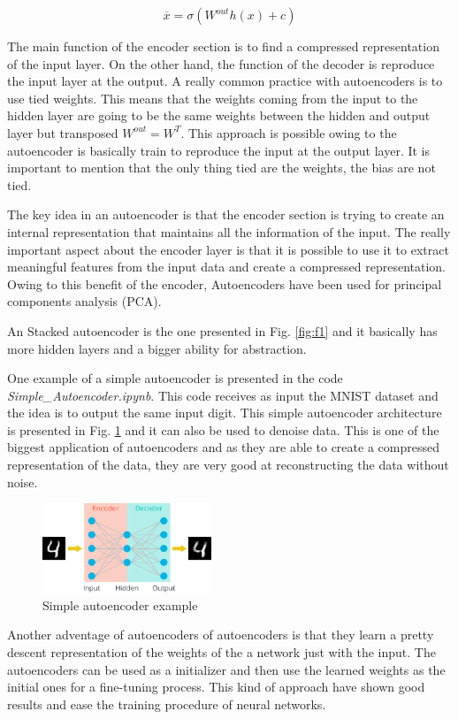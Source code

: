 \documentclass{article}
\begin{document}
\begin{equation}
\overline{x} = \sigma(W^{out}h(x) + c)
\label{eq:2}
\end{equation}

The main function of the encoder section is to find a compressed representation of the input layer. On the other hand, the function of the decoder is reproduce the input layer at the output. A really common practice with autoencoders is to use tied weights. This means that the weights coming from the input to the hidden layer are going to be the same weights between the hidden and output layer but transposed \(W^{out} = W^T\). This approach is possible owing to the autoencoder is basically train to reproduce the input at the output layer. It is important to mention that the only thing tied are the weights, the bias are not tied.

The key idea in an autoencoder is that the encoder section is trying to create an internal representation that maintains all the information of the input. The really important aspect about the encoder layer is that it is possible to use it to extract meaningful features from the input data and create a compressed representation. Owing to this benefit of the encoder, Autoencoders have been used for principal components analysis (PCA).

An Stacked autoencoder is the one presented in Fig. \ref{fig:f1} and it basically has more hidden layers and a bigger ability for abstraction.

One example of a simple autoencoder is presented in the code \textit{Simple\_Autoencoder.ipynb}. This code receives as input the MNIST dataset and the idea is to output the same input digit. This simple autoencoder architecture is presented in Fig. \ref{fig:f4} and it can also be used to denoise data. This is one of the biggest application of autoencoders and as they are able to create a compressed representation of the data, they are very good at reconstructing the data without noise.

\begin{figure}[ht]
    \centering
    \includegraphics[width=0.45\textwidth,height=0.45\textheight,keepaspectratio]{images/simple_autoencoder.png}
    \captionsetup{justification=centering}
    \caption{Simple autoencoder example}
    \label{fig:f4}
\end{figure}



Another adventage of autoencoders of autoencoders is that they learn a pretty descent representation of the weights of the a network just with the input. The autoencoders can be used as a initializer and then use the learned weights as the initial ones for a fine-tuning process. This kind of approach have shown good results and ease the training procedure of neural networks.


\printbibliography
\end{document}
